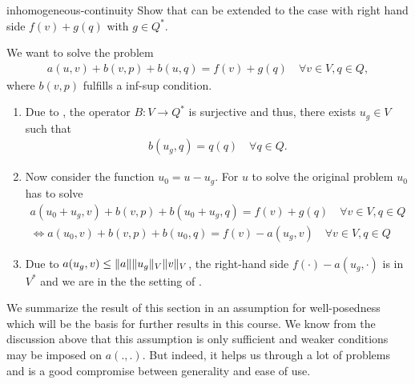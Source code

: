 \begin{Problem}{inhomogeneous-continuity}
  Show that  can be extended to the
  case with right hand side $f(v)+g(q)$ with $g\in Q^*$.

\begin{solution}
  We want to solve the problem
  \begin{align*}
    a(u,v) + b(v,p) + b(u,q) = f(v)+g(q) \quad\forall v\in V, q\in Q,
  \end{align*}
  where $b(v,p)$ fulfills a inf-sup condition.

  \begin{enumerate}
  \item Due to , the
    operator $B: V\to Q^*$ is surjective and thus, there exists
    $u_g\in V$ such that
    \begin{gather*}
      b(u_g,q) = q(q) \quad\forall q\in Q.
    \end{gather*}
  \item Now consider the function $u_0 = u-u_g$. For $u$ to solve the
    original problem $u_0$ has to solve
    \begin{align*}
      a(u_0+u_g,v) + b(v,p) + b(u_0+u_g,q) = f(v)+g(q) \quad\forall v\in V, q\in Q\\
      \Leftrightarrow a(u_0,v) + b(v,p) + b(u_0,q) = f(v)-a(u_g,v) \quad\forall v\in V, q\in Q
    \end{align*}
  \item Due to $a(u_g,v) \leq \lVert a\rVert\lVert u_g\rVert_V\lVert v\rVert_V$,
    the right-hand side $f(\cdot)-a(u_g,\cdot)$ is in $V^*$
    and we are in the the setting of
    .
  \end{enumerate}
\end{solution}
\end{Problem}

\begin{intro}
  We summarize the result of this section in an assumption for
  well-posedness which will be the basis for further results in this
  course. We know from the discussion above that this assumption is
  only sufficient and weaker conditions may be imposed on
  $a(.,.)$. But indeed, it helps us through a lot of problems and is a
  good compromise between generality and ease of use.
\end{intro}

